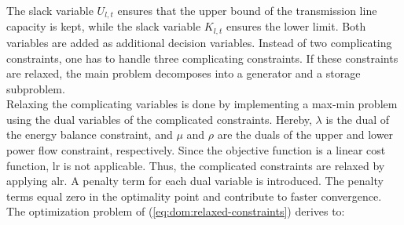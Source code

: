 The slack variable $U_{l,t}$ ensures that the upper bound of the transmission line capacity is kept, while the slack variable $K_{l,t}$ ensures the lower limit. Both variables are added as additional decision variables. Instead of two complicating constraints, one has to handle three complicating constraints. If these constraints are relaxed, the main problem decomposes into a generator and a storage subproblem.\\

Relaxing the complicating variables is done by implementing a max-min problem using the dual variables of the complicated constraints. Hereby, $\lambda$ is the dual of the energy balance constraint, and $\mu$ and $\rho$ are the duals of the upper and lower power flow constraint, respectively. Since the objective function is a linear cost function, \gls{lr} is not applicable. Thus, the complicated constraints are relaxed by applying \gls{alr}. A penalty term for each dual variable is introduced. The penalty terms equal zero in the optimality point and contribute to faster convergence. The optimization problem of (\ref{eq:dom:relaxed-constraints}) derives to:

